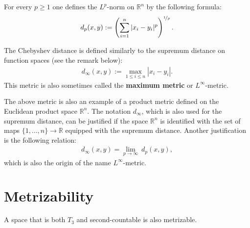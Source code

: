     \begin{example}[p-metric]
        For every $p\geq1$ one defines the $L^p$-norm on $\mathbb{R}^n$ by the following formula:
        \begin{gather}
            \label{topology:p_metric}
            d_p(x,y) := \left(\sum_{i=1}^n|x_i-y_i|^p\right)^{\nicefrac{1}{p}}.
        \end{gather}
    \end{example}
    \begin{example}
        The Chebyshev distance is defined similarly to the supremum distance on function spaces (see the remark below):
        \begin{gather}
            \label{topology:chebyshev_distance}
            d_\infty(x,y) := \max_{1\leq i\leq n}|x_i - y_i|.
        \end{gather}
        This metric is also sometimes called the \textbf{maximum metric} or $L^\infty$-metric.
    \end{example}
    \begin{remark}
        The above metric is also an example of a product metric defined on the Euclidean product space $\mathbb{R}^n$. The notation $d_\infty$, which is also used for the supremum distance, can be justified if the space $\mathbb{R}^n$ is identified with the set of maps $\{1,...,n\}\rightarrow \mathbb{R}$ equipped with the supremum distance. Another justification is the following relation:
        \begin{gather}
            d_\infty(x,y) = \lim_{p\rightarrow\infty}\ d_p(x,y),
        \end{gather}
        which is also the origin of the name $L^\infty$-metric.
    \end{remark}

\section{Metrizability}

    \begin{theorem}
        A space that is both $T_3$ and second-countable is also metrizable.
    \end{theorem}

